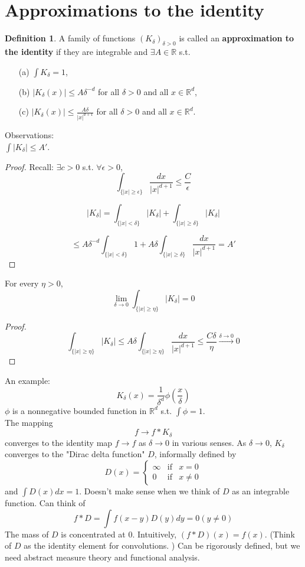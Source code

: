 \documentclass{article}
\theoremstyle{definition}
\newtheorem{dfn}{Definition}
\begin{document}
\section{Approximations to the identity}
\begin{dfn}
	A family of functions $(K_\delta)_{\delta>0}$ is called an \textbf{approximation to the identity} if they are integrable and $\exists A \in \mathbb{R}$ s.t.
  \begin{itemize}
    \item[(a)]$\int K_{\delta} = 1$, 
    \item[(b)]$|K_{\delta}(x)| \leq A \delta^{-d}$ for all $\delta > 0$ and all $x \in \mathbb{R}^d$, 
    \item[(c)]$|K_{\delta}(x)| \leq \frac{A\delta}{|x|^{d+1}}$ for all $\delta > 0$ and all $x \in \mathbb{R}^d$. 
  \end{itemize}
\end{dfn}
Observations: \\
$\int |K_\delta| \leq A'$. 
\begin{proof}
  Recall: $\exists c > 0$ s.t. $\forall \epsilon > 0$, 
  $$\int_{\{|x| \geq \epsilon\}} \frac{dx}{|x|^{d+1}} \leq \frac{C}{\epsilon}$$

  $$|K_\delta| = \int_{\{|x| < \delta\}} |K_\delta| + \int_{\{|x| \geq \delta\}} |K_{\delta}|$$

  $$\leq A \delta^{-d} \int_{\{|x| < \delta\}} 1 + A \delta \int_{\{|x| \geq \delta\}} \frac{dx}{|x|^{d+1}} = A'$$ 
\end{proof}
For every $\eta > 0$, 
$$\lim_{\delta \to 0} \int_{\{|x| \geq \eta\}} |K_{\delta}| = 0$$
\begin{proof}
  $$\int_{\{|x| \geq \eta\}} |K_\delta| \leq A \delta \int_{\{|x| \geq \eta\}} \frac{dx}{|x|^{d+1}} \leq \frac{C \delta}{\eta} \stackrel{\delta \to 0}{\to} 0$$
\end{proof}
An example:
$$K_\delta(x) = \frac{1}{\delta^d} \phi(\frac{x}{\delta})$$
$\phi$ is a nonnegative bounded function in $\mathbb{R}^d$ s.t. $\int \phi = 1$. \\
The mapping $$f \rightarrow f * K_{\delta}$$ converges to the identity map $f \rightarrow f$ as $\delta \to 0$ in various senses. As $\delta \to 0$, $K_\delta$ converges to the "Dirac delta function" $D$, informally defined by 
$$
D(x) = 
\left\{
  \begin{array}{ccc}
    \infty & \text{if} & x = 0\\
    0 & \text{if} & x \neq 0 
  \end{array}
  \right. 
$$
and $\int D(x) dx = 1$. Doesn't make sense when we think of $D$ as an integrable function. Can think of 
$$f*D = \int f(x - y) D(y) dy = 0 (y \neq 0)$$
The mass of $D$ is concentrated at 0. Intuitively, $(f*D)(x) = f(x)$. (Think of $D$ as the identity element for convolutions. ) Can be rigorously defined, but we need abstract measure theory and functional analysis.
\end{document}

